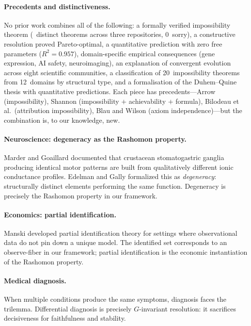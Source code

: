 \documentclass[11pt,a4paper]{article}
\begin{document}
\paragraph{Precedents and distinctiveness.}
No prior work combines all of the following: a formally verified
impossibility theorem (\ClaimDistinctTheorems~distinct theorems across three repositories, 0~sorry), a constructive
resolution proved Pareto-optimal, a quantitative prediction with zero
free parameters ($R^2 = 0.957$), domain-specific empirical consequences
(gene expression, AI safety, neuroimaging), an explanation of convergent
evolution across eight scientific communities, a classification of
20~impossibility theorems from 12~domains by structural type, and a
formalisation of the Duhem--Quine thesis with quantitative predictions.
Each piece has precedents---Arrow (impossibility), Shannon (impossibility
$+$ achievability $+$ formula), Bilodeau et al.\ (attribution
impossibility), Blau and Wilson (axiom independence)---but the
combination is, to our knowledge, new.

\paragraph{Neuroscience: degeneracy as the Rashomon property.}
Marder and Goaillard \citep{marder2006variability} documented that crustacean
stomatogastric ganglia producing identical motor patterns are built from
qualitatively different ionic conductance profiles.  Edelman and Gally
\citep{edelman2001degeneracy} formalized this as \emph{degeneracy}:
structurally distinct elements performing the same function.  Degeneracy is
precisely the Rashomon property in our framework.

\paragraph{Economics: partial identification.}
Manski \citep{manski2003partial} developed partial identification theory for
settings where observational data do not pin down a unique model.  The
identified set corresponds to an observe-fiber in our framework; partial
identification is the economic instantiation of the Rashomon property.

\paragraph{Medical diagnosis.}
When multiple conditions produce the same symptoms, diagnosis faces the
trilemma.  Differential diagnosis is precisely $G$-invariant resolution:
it sacrifices decisiveness for faithfulness and stability.
\end{document}

